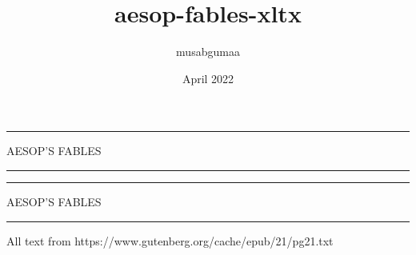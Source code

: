 \documentclass[a5paper, 11pt]{memoir}
\title{aesop-fables-xltx}
\author{musabgumaa}
\date{April 2022}
\begin{document}
{\pagecolor{black}
\color{white}
\begin{titlepage}
    \pagestyle{empty}
    \begin{vplace}
        \begin{center}
            \rule{\textwidth}{2pt}
            \smallskip

            \Huge AESOP'S FABLES
            
            \rule{\textwidth}{2pt}
        \end{center}
        \vspace{1in}
    \end{vplace}
    \clearpage
\end{titlepage}
\pagecolor{white}
}

\frontmatter

\begin{vplace}
    \begin{center}
        \rule{\textwidth}{2pt}
        \smallskip

        \Huge AESOP'S FABLES
        
        \rule{\textwidth}{2pt}
        
        \vspace{2in}
        
        \small All text from https://www.gutenberg.org/cache/epub/21/pg21.txt
    \end{center}
\end{vplace}

\clearpage

\tableofcontents

\mainmatter

\pagecolor{white}
\end{document}
